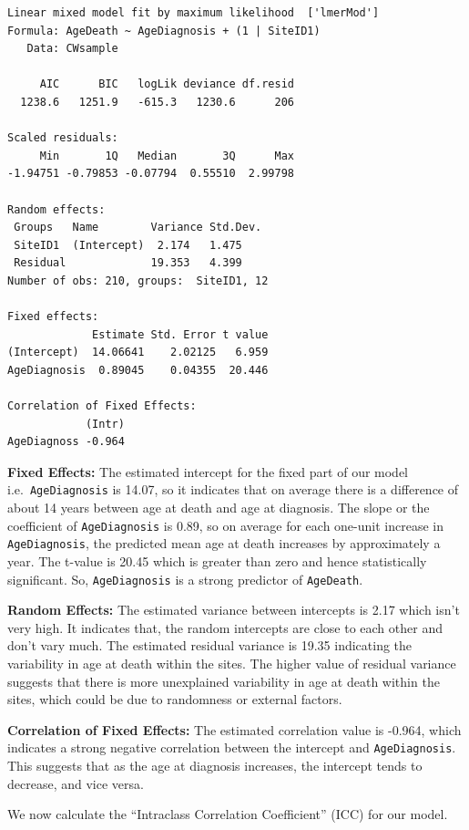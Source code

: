 \documentclass[
]{article}
\begin{document}
\begin{verbatim}
Linear mixed model fit by maximum likelihood  ['lmerMod']
Formula: AgeDeath ~ AgeDiagnosis + (1 | SiteID1)
   Data: CWsample

     AIC      BIC   logLik deviance df.resid 
  1238.6   1251.9   -615.3   1230.6      206 

Scaled residuals: 
     Min       1Q   Median       3Q      Max 
-1.94751 -0.79853 -0.07794  0.55510  2.99798 

Random effects:
 Groups   Name        Variance Std.Dev.
 SiteID1  (Intercept)  2.174   1.475   
 Residual             19.353   4.399   
Number of obs: 210, groups:  SiteID1, 12

Fixed effects:
             Estimate Std. Error t value
(Intercept)  14.06641    2.02125   6.959
AgeDiagnosis  0.89045    0.04355  20.446

Correlation of Fixed Effects:
            (Intr)
AgeDiagnoss -0.964
\end{verbatim}

\textbf{Fixed Effects:} The estimated intercept for the fixed part of
our model i.e.~\texttt{AgeDiagnosis} is 14.07, so it indicates that on
average there is a difference of about 14 years between age at death and
age at diagnosis. The slope or the coefficient of \texttt{AgeDiagnosis}
is 0.89, so on average for each one-unit increase in
\texttt{AgeDiagnosis}, the predicted mean age at death increases by
approximately a year. The t-value is 20.45 which is greater than zero
and hence statistically significant. So, \texttt{AgeDiagnosis} is a
strong predictor of \texttt{AgeDeath}.

\textbf{Random Effects:} The estimated variance between intercepts is
2.17 which isn't very high. It indicates that, the random intercepts are
close to each other and don't vary much. The estimated residual variance
is 19.35 indicating the variability in age at death within the sites.
The higher value of residual variance suggests that there is more
unexplained variability in age at death within the sites, which could be
due to randomness or external factors.

\textbf{Correlation of Fixed Effects:} The estimated correlation value
is -0.964, which indicates a strong negative correlation between the
intercept and \texttt{AgeDiagnosis}. This suggests that as the age at
diagnosis increases, the intercept tends to decrease, and vice versa.

We now calculate the ``Intraclass Correlation Coefficient'' (ICC) for
our model.
\end{document}
